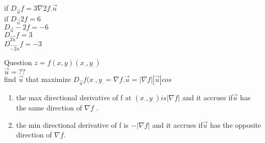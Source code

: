 \noindent{\color{smalt(darkpowderblue)}\rule{\linewidth}{.2mm}}
\begin{example}
if $D_{\overrightarrow{u}} f = 3    \nabla 2f .{\overrightarrow{u}}$\\
if $D_{\overrightarrow{u}} 2f = 6$\\
$D_{\overrightarrow{u}} -2f = -6$\\
$D_{\overrightarrow{2u}} f = 3$\\
$D_{\overrightarrow{-2u}} f = -3 $
\end{example}
\noindent{\color{smalt(darkpowderblue)}\rule{\linewidth}{.2mm}}
Question $z = f(x,y)(x_\cdot , y_\cdot)$\\
${\overrightarrow{u}} = ??$\\
find ${\overrightarrow{u}}$ that maximize $D_{\overrightarrow{u}} f(x_\cdot , y_\cdot = \nabla f .{\overrightarrow{u}} = |\nabla f| |{\overrightarrow{u}}| cos$\\


\begin{theorem}
 \begin{enumerate}
    \item the max directional derivative of f at $(x_\cdot , y_\cdot) is |\nabla f|$ and it accrues if${\overrightarrow{u}}$ has the same direction of $\nabla f$ .
    \item the min directional derivative of f is $-|\nabla f | $ and it accrues if${\overrightarrow{u}}$ has the opposite direction of $\nabla f$.
\end{enumerate}
\end{theorem}

